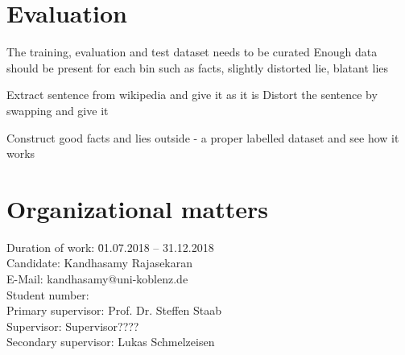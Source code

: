 \documentclass[a4paper, 11pt]{article}
\makeatletter
\newcommand{\myName}{Kandhasamy Rajasekaran}
\newcommand{\emailID}{kandhasamy@uni-koblenz.de}
\newcommand{\matriculationID}{216100855}
\newcommand{\StartDate}{01.07.2018}
\newcommand{\EndDate}{31.12.2018}
\newcommand{\expert}{Prof. Dr. Steffen Staab}%
\newcommand{\supervisor}{Supervisor????} %
\newcommand{\secondSupervisor}{Lukas Schmelzeisen} %
\makeatother
\begin{document}





\section{Evaluation}

The training, evaluation and test dataset needs to be curated
Enough data should be present for each bin such as facts, slightly distorted lie, blatant lies 

Extract sentence from wikipedia and give it as it is
Distort the sentence by swapping and give it 

Construct good facts and lies outside - a proper labelled dataset and see how it works
\newpage

\section{Organizational matters}

\begin{tabbing}
Duration of work: \hspace{1.1cm} \= \StartDate{} -- \EndDate{}\\
\vspace{0.5ex}Candidate:	\> \myName{}\\
\vspace{0.5ex}E-Mail:	\> \emailID{}\\
\vspace{0.5ex}Student number: \> \matriculationID{}\\
\vspace{0.5ex}Primary supervisor: \> \expert{}\\
Supervisor: \> \supervisor{}\\
Secondary supervisor: \> \secondSupervisor{}\\
\end{tabbing}
\end{document}
